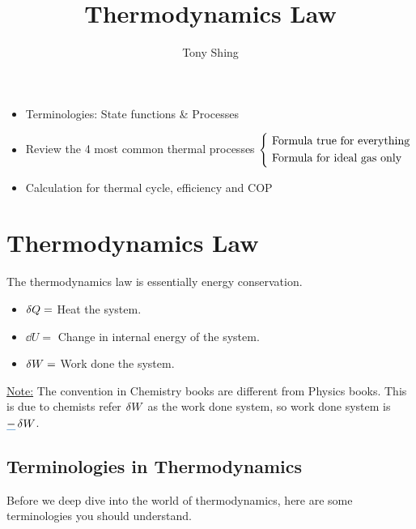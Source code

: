 \documentclass[class=article, crop=false, 12pt]{standalone}
\author{Tony Shing}
\title{Thermodynamics \nth{1} Law}
\begin{document}
\maketitle


\begin{overview}
    \begin{itemize}
        \item Terminologies: State functions \& Processes
        \item Review the 4 most common thermal processes 
        $\left\{ \ \begin{aligned} 
            &\text{Formula true for everything} \\ 
            &\text{Formula for ideal gas only}
         \end{aligned}\right.$
        \item Calculation for thermal cycle, efficiency and COP
    \end{itemize}
\end{overview}


\section{Thermodynamics  Law}

The thermodynamics  law is essentially energy conservation.
\begin{itemize}
    \item $\var{Q} = $ Heat  the system.
    \item $\dd{U} = $ Change in internal energy of the system.
    \item $\var{W} = $ Work done  the system.
\end{itemize}

\ul{Note:} The convention in Chemistry books are different from Physics books.
This is due to chemists refer $\var{W}$ as the work done  system,
so work done  system is $\cul[blue]{-}\var{W}$.


\subsection{Terminologies in Thermodynamics}

Before we deep dive into the world of thermodynamics, 
here are some terminologies you should understand.
\end{document}
